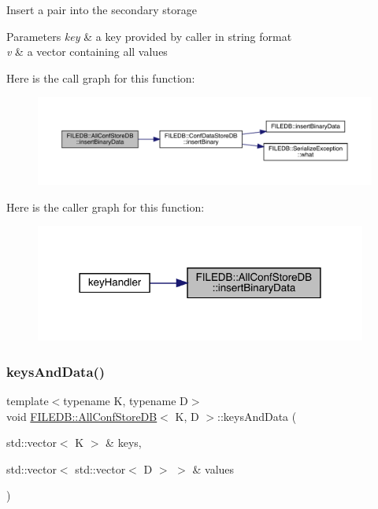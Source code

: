 Insert a pair into the secondary storage 
\begin{DoxyParams}{Parameters}
{\em key} & a key provided by caller in string format \\
\hline
{\em v} & a vector containing all values \\
\hline
\end{DoxyParams}
Here is the call graph for this function\+:
\nopagebreak
\begin{figure}[H]
\begin{center}
\leavevmode
\includegraphics[width=350pt]{df/db6/classFILEDB_1_1AllConfStoreDB_ac2c898624d4b32c526951edfb6271d60_cgraph}
\end{center}
\end{figure}
Here is the caller graph for this function\+:
\nopagebreak
\begin{figure}[H]
\begin{center}
\leavevmode
\includegraphics[width=309pt]{df/db6/classFILEDB_1_1AllConfStoreDB_ac2c898624d4b32c526951edfb6271d60_icgraph}
\end{center}
\end{figure}
\mbox{\label{classFILEDB_1_1AllConfStoreDB_a9150983c712d6b870a75886f92b10a9d}} 
\subsubsection{\texorpdfstring{keysAndData()}{keysAndData()}\hspace{0.1cm}{\footnotesize\ttfamily [1/3]}}
{\footnotesize\ttfamily template$<$typename K, typename D$>$ \\
void \mbox{\hyperlink{classFILEDB_1_1AllConfStoreDB}{F\+I\+L\+E\+D\+B\+::\+All\+Conf\+Store\+DB}}$<$ K, D $>$\+::keys\+And\+Data (\begin{DoxyParamCaption}\item[{std\+::vector$<$ K $>$ \&}]{keys,  }\item[{std\+::vector$<$ std\+::vector$<$ D $>$ $>$ \&}]{values }\end{DoxyParamCaption})\hspace{0.3cm}{\ttfamily [inline]}}

